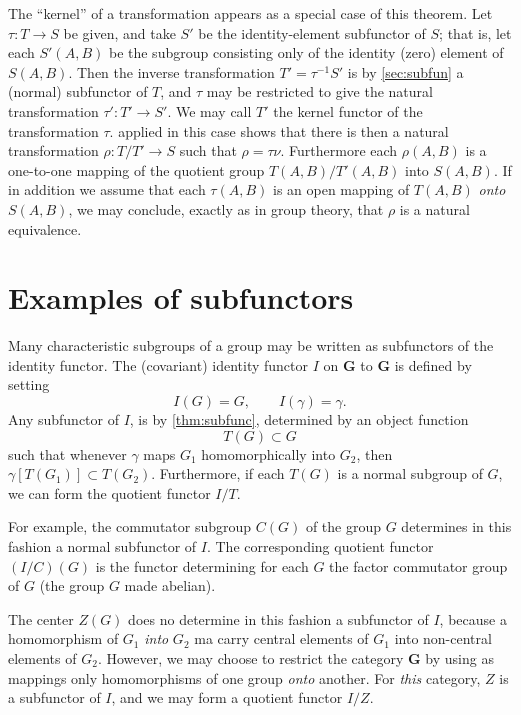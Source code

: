 \documentclass[11pt,a4paper]{report}
\begin{document}
The ``kernel'' of a transformation appears as a special case of this theorem. Let $\tau:T\rightarrow S$ be
given, and take $S'$ be the identity\hyp{}element subfunctor of $S$; that is, let each $S'(A,B)$ be the
subgroup consisting only of the identity (zero) element of $S(A,B)$. Then the inverse transformation 
$T'=\tau^{-1}S'$ is by \cref{sec:subfun} a (normal) subfunctor of $T$, and $\tau$ may be restricted to give
the natural transformation $\tau':T'\rightarrow S'$. We may call $T'$ the kernel functor of the transformation
$\tau$.  applied in this case shows that there is then a natural transformation $\rho:T/T'
\rightarrow S$ such that $\rho=\tau\nu$. Furthermore each $\rho(A,B)$ is a one\hyp{}to\hyp{}one mapping of the
quotient group $T(A,B)/T'(A,B)$ into $S(A,B)$. If in addition we assume that each $\tau(A,B)$ is an open mapping
of $T(A,B)$ \emph{onto} $S(A,B)$, we may conclude, exactly as in group theory, that $\rho$ is a natural equivalence.

\section{Examples of subfunctors}\label{sec:ex_funct}
Many characteristic subgroups of a group may be written as subfunctors of the identity functor. The (covariant)
identity functor $I$ on $\mathbf{G}$ to $\mathbf{G}$ is defined by setting
\begin{equation*}
	I(G)= G,\qquad I(\gamma)= \gamma.
\end{equation*}
Any subfunctor of $I$, is by \cref{thm:subfunc}, determined by an object function
\begin{equation*}
	T(G)\subset G
\end{equation*}
such that whenever $\gamma$ maps $G_1$ homomorphically into $G_2$, then $\gamma[T(G_1)]\subset T(G_2)$.
Furthermore, if each $T(G)$ is a normal subgroup of $G$, we can form the quotient functor $I/T$.

For example, the commutator subgroup $C(G)$ of the group $G$ determines in this fashion a normal subfunctor
of $I$. The corresponding quotient functor $(I/C)(G)$ is the functor determining for each $G$ the factor 
commutator group of $G$ (the group $G$ made abelian).

The center $Z(G)$ does no determine in this fashion a subfunctor of $I$, because a homomorphism of $G_1$
\emph{into} $G_2$ ma carry central elements of $G_1$ into non\hyp{}central elements of $G_2$. However, we
may choose to restrict the category $\mathbf{G}$ by using as mappings only homomorphisms of one group
\emph{onto} another. For \emph{this} category, $Z$ is a subfunctor of $I$, and we may form a quotient 
functor $I/Z$.
\end{document}
